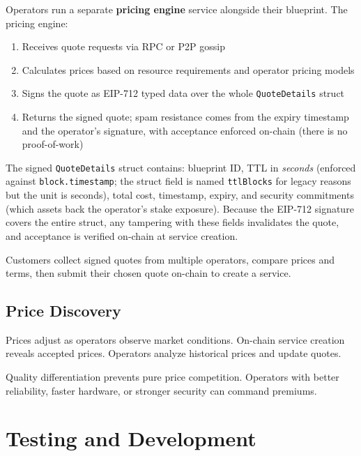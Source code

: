 \documentclass[11pt,a4paper]{article}
\begin{document}
Operators run a separate \textbf{pricing engine} service alongside their blueprint. The pricing engine:

\begin{enumerate}[noitemsep]
    \item Receives quote requests via RPC or P2P gossip
    \item Calculates prices based on resource requirements and operator pricing models
    \item Signs the quote as EIP-712 typed data over the whole \texttt{QuoteDetails} struct
    \item Returns the signed quote; spam resistance comes from the expiry timestamp and the operator's signature, with acceptance enforced on-chain (there is no proof-of-work)
\end{enumerate}

The signed \texttt{QuoteDetails} struct contains: blueprint ID, TTL in \emph{seconds} (enforced against \texttt{block.timestamp}; the struct field is named \texttt{ttlBlocks} for legacy reasons but the unit is seconds), total cost, timestamp, expiry, and security commitments (which assets back the operator's stake exposure). Because the EIP-712 signature covers the entire struct, any tampering with these fields invalidates the quote, and acceptance is verified on-chain at service creation.

Customers collect signed quotes from multiple operators, compare prices and terms, then submit their chosen quote on-chain to create a service.

\subsection{Price Discovery}

Prices adjust as operators observe market conditions. On-chain service creation reveals accepted prices. Operators analyze historical prices and update quotes.

Quality differentiation prevents pure price competition. Operators with better reliability, faster hardware, or stronger security can command premiums.

\section{Testing and Development}
\end{document}
